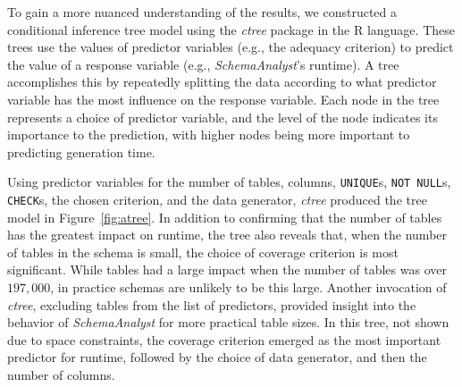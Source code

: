 
To gain a more nuanced understanding of the results, we constructed a conditional inference tree model using the
\textit{ctree} package in the R language. These trees use the values of predictor variables (e.g., the adequacy
criterion) to predict the value of a response variable (e.g., {\em SchemaAnalyst}'s runtime). A tree accomplishes this
by repeatedly splitting the data according to what predictor variable has the most influence on the response variable.
Each node in the tree represents a choice of predictor variable, and the level of the node indicates its importance to
the prediction, with higher nodes being more important to predicting generation time.



Using predictor variables for the number of tables, columns, {\tt UNIQUE}s, {\tt NOT NULL}s, {\tt CHECK}s, the chosen
criterion, and the data generator, \textit{ctree} produced the tree model in Figure~\ref{fig:atree}.  In addition to
confirming that the number of tables has the greatest impact on runtime, the tree also reveals that, when the number of
tables in the schema is small, the choice of coverage criterion is most significant.  While tables had a large impact
when the number of tables was over $197,000$, in practice schemas are unlikely to be this large. Another invocation of
\textit{ctree}, excluding tables from the list of predictors, provided insight into the behavior of
\textit{SchemaAnalyst} for more practical table sizes. In this tree, not shown due to space constraints, the coverage
criterion emerged as the most important predictor for runtime, followed by the choice of data generator, and then the
number of columns.
